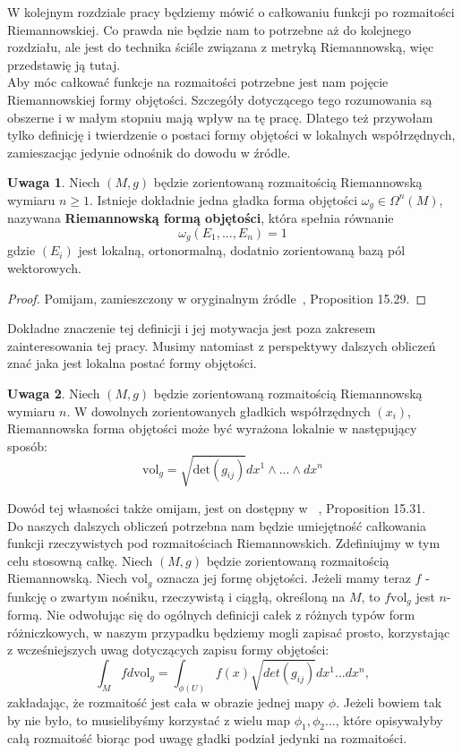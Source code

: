 \documentclass[licencjacka]{pracamgr}
\theoremstyle{definition}
\theoremstyle{definition}
\newtheorem{remark}{Uwaga}[section]
\theoremstyle{plain}
\theoremstyle{plain}
\theoremstyle{plain}
\theoremstyle{plain}
\begin{document}
W kolejnym rozdziale pracy będziemy mówić o całkowaniu funkcji po rozmaitości
Riemannowskiej. Co prawda nie będzie nam to potrzebne aż do kolejnego 
rozdziału, ale jest do technika ściśle związana z metryką Riemannowską, więc
przedstawię ją tutaj. \\

Aby móc całkować funkcje na rozmaitości potrzebne jest nam pojęcie
Riemannowskiej formy objętości. Szczegóły dotyczącego tego rozumowania 
są obszerne i w małym stopniu mają wpływ na tę pracę. Dlatego też
przywołam tylko definicję i twierdzenie o postaci formy objętości
w lokalnych współrzędnych, zamieszacjąc jedynie odnośnik do dowodu w 
źródle. \\

\begin{remark}
Niech $(M, g)$ będzie zorientowaną rozmaitością Riemannowską wymiaru
$n \geq 1$. Istnieje dokładnie jedna gładka forma objętości
$\omega_g \in \Omega^n(M)$, nazywana \textbf{Riemannowską formą objętości},
która spełnia równanie
\[
\omega_g(E_1, ...,  E_n) = 1
\]
gdzie $(E_i)$ jest lokalną, ortonormalną, dodatnio zorientowaną bazą
pól wektorowych.
\end{remark}
\begin{proof}
Pomijam, zamieszczony w oryginalnym źródle~\cite{lee}, Proposition 15.29.
\end{proof}
Dokładne znaczenie tej definicji i jej motywacja jest poza
zakresem zainteresowania tej pracy. Musimy natomiast z perspektywy
dalszych obliczeń znać jaka jest lokalna postać formy objętości. \\

\begin{remark}\label{expression-for-volume-form}
Niech $(M, g)$ będzie zorientowaną rozmaitością Riemannowską wymiaru $n$.
 W dowolnych zorientowanych gładkich współrzędnych
$(x_i)$, Riemannowska forma objętości może być wyrażona lokalnie w następujący
sposób:
\[
    \text{vol}_g = \sqrt{\text{det}(g_{ij})} dx^1 \wedge ... \wedge dx^n
\]
\end{remark}
Dowód tej własności także omijam, jest on dostępny w ~\cite{lee}, Proposition
15.31. \\

Do naszych dalszych obliczeń potrzebna nam będzie umiejętność całkowania
funkcji rzeczywistych pod rozmaitościach Riemannowskich. Zdefiniujmy w tym celu
stosowną całkę.
Niech $(M, g)$ będzie zorientowaną rozmaitością Riemannowską. 
Niech $\text{vol}_g$ oznacza jej formę objętości. Jeżeli mamy teraz $f$ -
funkcję o zwartym nośniku, rzeczywistą i ciągłą, określoną na $M$, to
$f \text{vol}_g$ jest $n$-formą.
Nie odwołując się do ogólnych definicji całek z różnych typów form
różniczkowych, w naszym przypadku będziemy mogli zapisać prosto, korzystając z
wcześniejszych uwag dotyczących zapisu formy objętości:
\[ %
  \int_M f d \text{vol}_g = \int_{\phi (U)} f(x) \sqrt{det(g_{ij})} dx^1 ... dx^n,
\]
zakładając, że rozmaitość jest cała w obrazie jednej mapy
$\phi$. Jeżeli bowiem tak by nie było, to musielibyśmy korzystać z
wielu map $\phi_1, \phi_2 ... $, które opisywałyby całą rozmaitość
biorąc pod uwagę gładki podział jedynki na rozmaitości. \\
\end{document}
